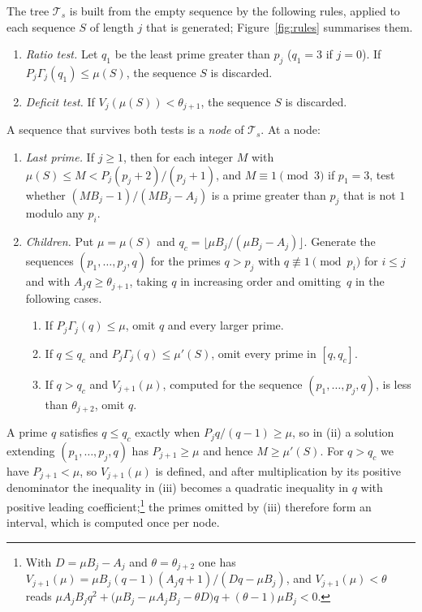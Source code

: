 \documentclass[11pt,reqno]{amsart}
\numberwithin{equation}{section}
\theoremstyle{plain}
\theoremstyle{definition}
\theoremstyle{remark}
\begin{document}
The tree $\mathcal T_s$ is built from the empty sequence by the
following rules, applied to each sequence $S$ of length $j$ that is
generated; Figure~\ref{fig:rules} summarises them.

\begin{enumerate}[label=\textup{(R\arabic*)},leftmargin=*]
\item\label{r:ratio} \emph{Ratio test.} Let $q_1$ be the least prime
greater than $p_j$ ($q_1=3$ if $j=0$). If $P_j\Gamma_j(q_1)\le\mu(S)$,
the sequence $S$ is discarded.
\item\label{r:deficit} \emph{Deficit test.} If
$V_j(\mu(S))<\theta_{j+1}$, the sequence $S$ is discarded.
\end{enumerate}
A sequence that survives both tests is a \emph{node} of
$\mathcal T_s$. At a node:
\begin{enumerate}[label=\textup{(R\arabic*)},leftmargin=*,resume]
\item\label{r:last} \emph{Last prime.} If $j\ge1$, then for each
integer $M$ with $\mu(S)\le M<P_j(p_j+2)/(p_j+1)$, and
$M\equiv1\pmod3$ if $p_1=3$, test whether
$(MB_j-1)/(MB_j-A_j)$ is a prime greater than $p_j$ that is not $1$
modulo any $p_i$.
\item\label{r:children} \emph{Children.} Put $\mu=\mu(S)$ and
$q_c=\lfloor\mu B_j/(\mu B_j-A_j)\rfloor$. Generate the sequences
$(p_1,\dots,p_j,q)$ for the primes $q>p_j$ with
$q\not\equiv1\pmod{p_i}$ for $i\le j$ and with $A_jq\ge\theta_{j+1}$,
taking $q$ in increasing order and omitting~$q$ in the following
cases.
\begin{enumerate}[label=(\roman*)]
\item If $P_j\Gamma_j(q)\le\mu$, omit $q$ and every larger prime.
\item If $q\le q_c$ and $P_j\Gamma_j(q)\le\mu'(S)$, omit every prime
in $[q,q_c]$.
\item If $q>q_c$ and $V_{j+1}(\mu)$, computed for the sequence
$(p_1,\dots,p_j,q)$, is less than $\theta_{j+2}$, omit $q$.
\end{enumerate}
\end{enumerate}

A prime $q$ satisfies $q\le q_c$ exactly when $P_jq/(q-1)\ge\mu$, so
in (ii) a solution extending $(p_1,\dots,p_j,q)$ has $P_{j+1}\ge\mu$
and hence $M\ge\mu'(S)$. For $q>q_c$ we have $P_{j+1}<\mu$, so
$V_{j+1}(\mu)$ is defined, and after multiplication by its positive
denominator the inequality in (iii) becomes a quadratic inequality in
$q$ with positive leading coefficient;\footnote{With $D=\mu B_j-A_j$
and $\theta=\theta_{j+2}$ one has $V_{j+1}(\mu)=\mu B_j(q-1)(A_jq+1)/(Dq-\mu
B_j)$, and $V_{j+1}(\mu)<\theta$ reads
$\mu A_jB_jq^2+\bigl(\mu B_j-\mu A_jB_j-\theta D\bigr)q+(\theta-1)\mu
B_j<0$.} the primes omitted by (iii)
therefore form an interval, which is computed once per node.
\end{document}
